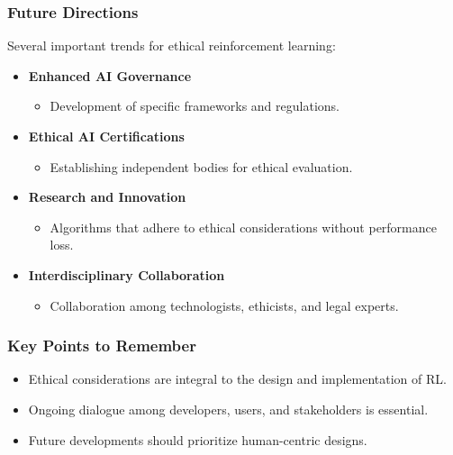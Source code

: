 \documentclass{beamer}
\begin{document}
\begin{frame}[fragile]
    \frametitle{Future Directions}
    Several important trends for ethical reinforcement learning:
    
    \begin{itemize}
        \item \textbf{Enhanced AI Governance}
            \begin{itemize}
                \item Development of specific frameworks and regulations.
            \end{itemize}
        
        \item \textbf{Ethical AI Certifications}
            \begin{itemize}
                \item Establishing independent bodies for ethical evaluation.
            \end{itemize}
        
        \item \textbf{Research and Innovation}
            \begin{itemize}
                \item Algorithms that adhere to ethical considerations without performance loss.
            \end{itemize}
        
        \item \textbf{Interdisciplinary Collaboration}
            \begin{itemize}
                \item Collaboration among technologists, ethicists, and legal experts.
            \end{itemize}
    \end{itemize}
\end{frame}

\begin{frame}[fragile]
    \frametitle{Key Points to Remember}
    \begin{itemize}
        \item Ethical considerations are integral to the design and implementation of RL.
        \item Ongoing dialogue among developers, users, and stakeholders is essential.
        \item Future developments should prioritize human-centric designs.
    \end{itemize}
\end{frame}
\end{document}

